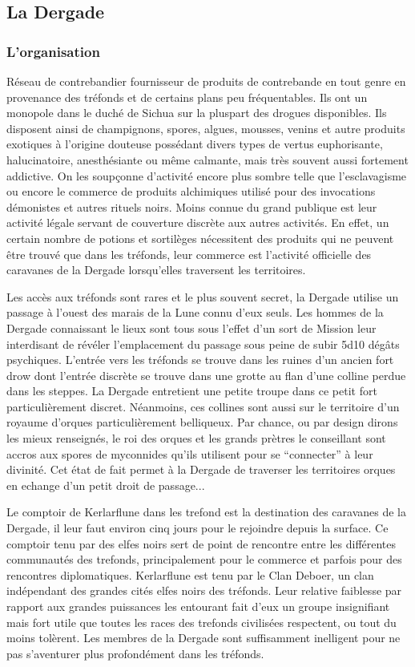 \subsection{La Dergade}

\subsubsection*{L'organisation}

Réseau de contrebandier fournisseur de produits de contrebande en tout genre
en provenance des tréfonds et de certains plans peu fréquentables. Ils ont 
un monopole dans le duché de Sichua sur la pluspart des drogues disponibles. 
Ils disposent ainsi de champignons, spores, algues, mousses, venins et autre 
produits exotiques à l'origine douteuse possédant divers types de vertus 
euphorisante, halucinatoire, anesthésiante ou même calmante, mais très 
souvent aussi fortement addictive. On les soupçonne d'activité encore plus 
sombre telle que l'esclavagisme ou encore le commerce de produits alchimiques 
utilisé pour des invocations démonistes et autres rituels noirs. Moins connue
du grand publique est leur activité légale servant de couverture discrète aux
autres activités. En effet, un certain nombre de potions et sortilèges 
nécessitent des produits qui ne peuvent être trouvé que dans les tréfonds,
leur commerce est l'activité officielle des caravanes de la Dergade 
lorsqu'elles traversent les territoires.

Les accès aux tréfonds sont rares et le plus souvent secret, la Dergade 
utilise un passage à l'ouest des marais de la Lune connu d'eux seuls. Les
hommes de la Dergade connaissant le lieux sont tous sous l'effet d'un sort de
Mission leur interdisant de révéler l'emplacement du passage sous peine de
subir 5d10 dégâts psychiques. L'entrée vers les tréfonds se trouve dans les
ruines d'un ancien fort drow dont l'entrée discrète se trouve dans une grotte
au flan d'une colline perdue dans les steppes. La Dergade entretient une petite
troupe dans ce petit fort particulièrement discret. Néanmoins, ces collines
sont aussi sur le territoire d'un royaume d'orques particulièrement belliqueux.
Par chance, ou par design dirons les mieux renseignés, le roi des orques et
les grands prètres le conseillant sont accros aux spores de myconnides qu'ils
utilisent pour se ``connecter'' à leur divinité. Cet état de fait permet à la
Dergade de traverser les territoires orques en echange d'un petit droit de
passage...

Le comptoir de Kerlarflune dans les trefond est la destination des caravanes 
de la Dergade, il leur faut environ cinq jours pour le rejoindre depuis la 
surface. Ce comptoir tenu par des elfes noirs sert de point de rencontre 
entre les différentes communautés des trefonds, principalement pour le 
commerce et parfois pour des rencontres diplomatiques. Kerlarflune est tenu
par le Clan Deboer, un clan indépendant des grandes cités elfes noirs des 
tréfonds. Leur relative faiblesse par rapport aux grandes puissances les 
entourant fait d'eux un groupe insignifiant mais fort utile que toutes les
races des trefonds civilisées respectent, ou tout du moins tolèrent. Les 
membres de la Dergade sont suffisamment inelligent pour ne pas s'aventurer 
plus profondément dans les tréfonds.

